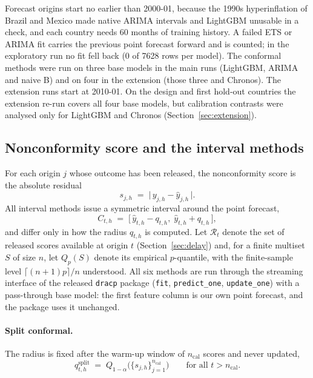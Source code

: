 Forecast origins start no earlier than 2000-01, because the 1990s hyperinflation of Brazil and Mexico made native ARIMA intervals and LightGBM unusable in a check, and each country needs 60 months of training history. A failed ETS or ARIMA fit carries the previous point forecast forward and is counted; in the exploratory run no fit fell back (0 of 7628 rows per model). The conformal methods were run on three base models in the main runs (LightGBM, ARIMA and naive B) and on four in the extension (those three and Chronos). The extension runs start at 2010-01. On the design and first hold-out countries the extension re-run covers all four base models, but calibration contrasts were analysed only for LightGBM and Chronos (Section~\ref{sec:extension}).

\subsection{Nonconformity score and the interval methods}\label{sec:intervals}

For each origin $j$ whose outcome has been released, the nonconformity score is the absolute residual
\begin{equation}\label{eq:score}
s_{j,h} \;=\; \bigl|\,y_{j,h}-\hat y_{j,h}\,\bigr|.
\end{equation}
All interval methods issue a symmetric interval around the point forecast,
\begin{equation}\label{eq:interval}
C_{t,h} \;=\; \bigl[\,\hat y_{t,h}-q_{t,h},\;\hat y_{t,h}+q_{t,h}\,\bigr],
\end{equation}
and differ only in how the radius $q_{t,h}$ is computed. Let $\mathcal R_{t}$ denote the set of released scores available at origin $t$ (Section~\ref{sec:delay}) and, for a finite multiset $S$ of size $n$, let $Q_{p}(S)$ denote its empirical $p$-quantile, with the finite-sample level $\lceil (n+1)p\rceil/n$ understood. All six methods are run through the streaming interface of the released \texttt{dracp} package (\texttt{fit}, \texttt{predict\_one}, \texttt{update\_one}) with a pass-through base model: the first feature column is our own point forecast, and the package uses it unchanged.

\paragraph{Split conformal.} The radius is fixed after the warm-up window of $n_{\mathrm{cal}}$ scores and never updated,
\begin{equation}\label{eq:split}
q^{\mathrm{split}}_{t,h} \;=\; Q_{1-\alpha}\bigl(\{s_{j,h}\}_{j=1}^{n_{\mathrm{cal}}}\bigr)\qquad\text{for all } t>n_{\mathrm{cal}}.
\end{equation}

